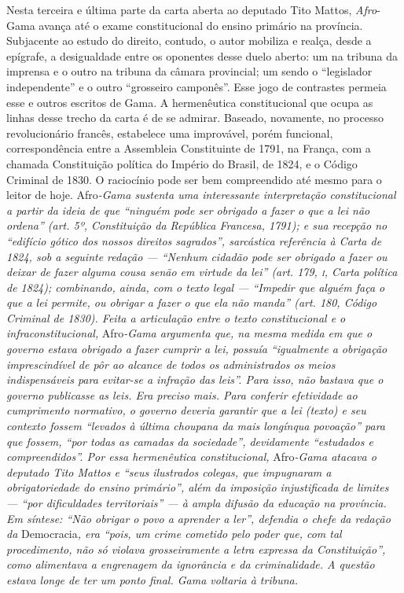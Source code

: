 \begin{didascalia}
Nesta terceira e última parte da carta aberta ao deputado Tito
Mattos,\emph{ Afro}-Gama avança até o exame constitucional do ensino
primário na província. Subjacente ao estudo do direito, contudo, o autor
mobiliza e realça, desde a epígrafe, a desigualdade entre os oponentes
desse duelo aberto: um na tribuna da imprensa e o outro na tribuna da
câmara provincial; um sendo o ``legislador independente'' e o outro
``grosseiro camponês''. Esse jogo de contrastes permeia esse e outros
escritos de Gama. A hermenêutica constitucional que ocupa as linhas
desse trecho da carta é de se admirar. Baseado, novamente, no processo
revolucionário francês, estabelece uma improvável, porém funcional,
correspondência entre a Assembleia Constituinte de 1791, na França, com
a chamada Constituição política do Império do Brasil, de 1824, e o
Código Criminal de 1830. O raciocínio pode ser bem compreendido até
mesmo para o leitor de hoje. Afro\emph{-Gama sustenta uma interessante
interpretação constitucional a partir da ideia de que ``ninguém pode ser
obrigado a fazer o que a lei não ordena'' (art. 5º, Constituição da
República Francesa, 1791); e sua recepção no ``edifício gótico dos nossos
direitos sagrados'', sarcástica referência à Carta de 1824, sob a
seguinte redação --- ``Nenhum cidadão pode ser obrigado a fazer ou deixar
de fazer alguma cousa senão em virtude da lei'' (art. 179, \textsc{i}, Carta
política de 1824); combinando, ainda, com o texto legal --- ``Impedir que
alguém faça o que a lei permite, ou obrigar a fazer o que ela não manda''
(art. 180, Código Criminal de 1830). Feita a articulação entre o texto
constitucional e o infraconstitucional,} Afro\emph{-Gama argumenta que,
na mesma medida em que o governo estava obrigado a fazer cumprir a lei,
possuía ``igualmente a obrigação imprescindível de pôr ao alcance de
todos os administrados os meios indispensáveis para evitar-se a infração
das leis''. Para isso, não bastava que o governo publicasse as leis. Era
preciso mais. Para conferir efetividade ao cumprimento normativo, o
governo deveria garantir que a lei (texto) e seu contexto fossem
``levados à última choupana da mais longínqua povoação'' para que
fossem, ``por todas as camadas da sociedade'', devidamente
``estudados e compreendidos''. Por essa hermenêutica
constitucional,} Afro\emph{-Gama atacava o deputado Tito Mattos e ``seus
ilustrados colegas, que impugnaram a obrigatoriedade do ensino
primário'', além da imposição injustificada de limites --- ``por
dificuldades territoriais'' --- à ampla difusão da educação na província.
Em síntese: ``Não obrigar o povo a aprender a ler'', defendia o chefe da
redação da} Democracia\emph{, era ``pois, um crime cometido pelo poder
que, com tal procedimento, não só violava grosseiramente a letra
expressa da Constituição'', como alimentava a engrenagem da ignorância e
da criminalidade. A questão estava longe de ter um ponto final. Gama
voltaria à tribuna.}
\end{didascalia}



